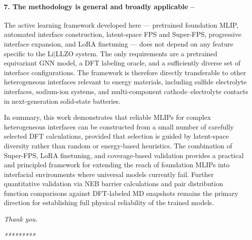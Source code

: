 \documentclass[12pt,a4paper,oneside]{book}
\begin{document}
\paragraph{7. The methodology is general and broadly applicable --}
The active learning framework developed here --- pretrained foundation MLIP, automated
interface construction, latent-space FPS and Super-FPS, progressive interface
expansion, and LoRA finetuning --- does not depend on any feature specific to the
Li$|$LLZO system. The only requirements are a pretrained equivariant GNN model, a
DFT labeling oracle, and a sufficiently diverse set of interface configurations. The
framework is therefore directly transferable to other heterogeneous interfaces relevant
to energy materials, including sulfide electrolyte interfaces, sodium-ion systems, and
multi-component cathode--electrolyte contacts in next-generation solid-state batteries.

\bigskip
\noindent In summary, this work demonstrates that reliable MLIPs for complex
heterogeneous interfaces can be constructed from a small number of carefully selected
DFT calculations, provided that selection is guided by latent-space diversity rather
than random or energy-based heuristics. The combination of Super-FPS, LoRA
finetuning, and coverage-based validation provides a practical and principled
framework for extending the reach of foundation MLIPs into interfacial environments
where universal models currently fail. Further quantitative validation via NEB barrier calculations and pair distribution
function comparisons against DFT-labeled MD snapshots remains the primary direction
for establishing full physical reliability of the trained models.


\printbibliography
\newpage
\thispagestyle{empty}
\vspace*{\fill}
\begin{center}
\textit{Thank you.}
\end{center}
\vspace*{\fill}
\newpage
\thispagestyle{empty}
\vspace*{\fill}
\begin{center}
\textit{*********}
\end{center}
\vspace*{\fill}
\end{document}
